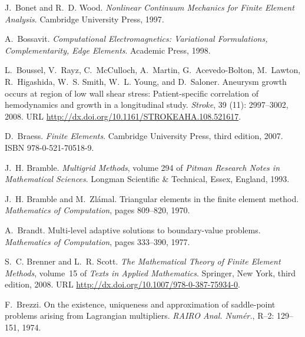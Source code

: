 \begin{thebibliography}{467}
J.~Bonet and R.~D. Wood.
\newblock \emph{Nonlinear Continuum Mechanics for Finite Element Analysis}.
\newblock Cambridge University Press, 1997.

A.~Bossavit.
\newblock \emph{Computational Electromagnetics: Variational Formulations,
  Complementarity, Edge Elements}.
\newblock Academic Press, 1998.

L.~Boussel, V.~Rayz, C.~McCulloch, A.~Martin, G.~Acevedo-Bolton, M.~Lawton,
  R.~Higashida, W.~S. Smith, W.~L. Young, and D.~Saloner.
\newblock Aneurysm growth occurs at region of low wall shear stress:
  Patient-specific correlation of hemodynamics and growth in a longitudinal
  study.
\newblock \emph{Stroke}, 39 (11): 2997--3002, 2008.
\newblock URL \url{http://dx.doi.org/10.1161/STROKEAHA.108.521617}.

D.~Braess.
\newblock \emph{Finite Elements}.
\newblock Cambridge University Press, third edition, 2007.
\newblock ISBN 978-0-521-70518-9.

J.~H. Bramble.
\newblock \emph{Multigrid Methods}, volume 294 of \emph{Pitman Research Notes
  in Mathematical Sciences}.
\newblock Longman Scientific \& Technical, Essex, England, 1993.

J.~H. Bramble and M.~Zl{\'a}mal.
\newblock Triangular elements in the finite element method.
\newblock \emph{Mathematics of Computation}, pages 809--820, 1970.

A.~Brandt.
\newblock Multi-level adaptive solutions to boundary-value problems.
\newblock \emph{Mathematics of Computation}, pages 333--390, 1977.

S.~C. Brenner and L.~R. Scott.
\newblock \emph{The Mathematical Theory of Finite Element Methods}, volume~15
  of \emph{Texts in Applied Mathematics}.
\newblock Springer, New York, third edition, 2008.
\newblock URL \url{http://dx.doi.org/10.1007/978-0-387-75934-0}.

F.~Brezzi.
\newblock On the existence, uniqueness and approximation of saddle-point
  problems arising from {L}agrangian multipliers.
\newblock \emph{RAIRO Anal. Num\'er.}, R--2: 129--151, 1974.


\end{thebibliography}
